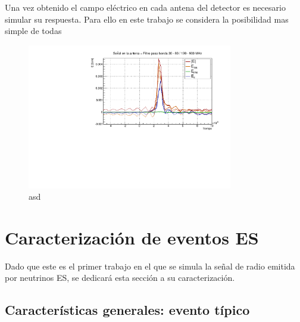 	Una vez obtenido el campo eléctrico en cada antena del detector es necesario simular su respuesta.
	Para ello en este trabajo se considera la posibilidad mas simple de todas
	
	
	\begin{figure}[ht!]
		\centering
		\includegraphics[width=0.8\textwidth]{./fig/simulacionRadio/antennaFilt}
		\caption{\label{fig:antHEnv}
		asd
		}
	\end{figure}
	
\section{Caracterizaci\'on de eventos ES}

Dado que este es el primer trabajo en el que se simula la señal de radio emitida por neutrinos ES, se dedicará esta sección a su caracterización.

	\subsection{Caracter\'isticas generales: evento típico}
	
